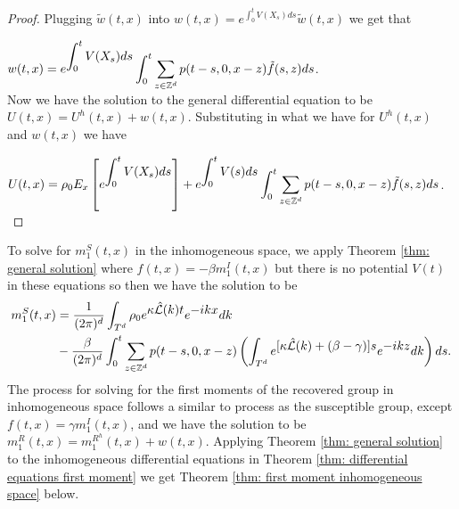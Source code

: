 \documentclass[sn-basic]{sn-jnl}%
\theoremstyle{thmstyleone}%
\theoremstyle{thmstyletwo}%
\theoremstyle{thmstylethree}%
\numberwithin{equation}{theorem}
\begin{document}
\begin{proof}
Plugging $\tilde{w}(t,x)$ into $w(t,x) = e^{\displaystyle \int_{0}^{t} V(X_{s})ds} \tilde{w}(t,x)$ we get that

$w(t,x) = e^{\displaystyle \int_{0}^{t} V(X_{s})ds} \displaystyle \int_{0}^{t} \sum\limits_{z \in \mathbb{Z}^{d}} \mathnormal{p} (t-s, 0, x-z) \tilde{f}(s,z)ds$.\\

Now we have the solution to the general differential equation to be $U(t,x) = U^{h}(t,x) + w(t,x)$. Substituting in what we have for $U^{h}(t,x)$ and $w(t,x)$ we have

$U(t,x) = \rho_{0} E_{x} \left[ e^{\displaystyle \int_{0}^{t} V(X_{s}) ds} \right] + e^{\displaystyle \int_{0}^{t} V(s)ds} \displaystyle \int_{0}^{t} \sum\limits_{z \in \mathbb{Z}^{d}} \mathnormal{p} (t-s, 0, x-z) \tilde{f}(s,z)ds$.\\
\end{proof}
To solve for $m_{1}^{S}(t,x)$ in the inhomogeneous space, we apply Theorem \ref{thm: general solution} where $f(t,x)= - \beta m_{1}^{I}(t,x)$ but there is no potential $V(t)$ in these equations so then we have the solution to be
\begin{align*}
m_{1}^{S}(t,x) &= \displaystyle \frac{1}{(2 \pi)^d} \int_{T^{d}} \rho_{0} e^{\displaystyle \kappa \hat{\mathcal{L}}(k) t} e^{\displaystyle -ikx}dk\\
&- \displaystyle \frac{\beta}{(2\pi)^d} \displaystyle \int_{0}^{t} \sum\limits_{z \in \mathbb{Z}^{d}} \mathnormal{p} (t-s, 0, x-z) \left(\displaystyle \int_{T^{d}} e^{\displaystyle [\kappa \hat{\mathcal{L}}(k) + (\beta - \gamma)]s} e^{\displaystyle -ikz} dk \right) ds.
\end{align*}
The process for solving for the first moments of the recovered group in inhomogeneous space follows a similar to process as the susceptible group, except $f(t,x) = \gamma m_{1}^{I}(t,x)$, and we have the solution to be $m_{1}^{R}(t,x) = m_{1}^{R^{h}}(t,x) + w(t,x)$. Applying Theorem \ref{thm: general solution} to the inhomogeneous differential equations in Theorem \ref{thm: differential equations first moment} we get Theorem \ref{thm: first moment inhomogeneous space} below.
\end{document}
